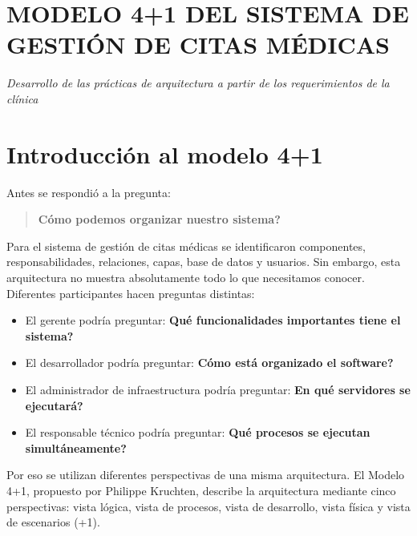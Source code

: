 \begingroup\sffamily\renewcommand{\arraystretch}{1.25}

\newcommand{\bloqueflujo}[1]{\fcolorbox{azuloscuro}{azulclaro}{\parbox{0.48\linewidth}{\centering\textbf{#1}}}}

\newcommand{\flechaflujo}{\textcolor{azuloscuro}{\Large$\downarrow$}}
\section*{MODELO 4+1 DEL SISTEMA DE GESTIÓN DE CITAS MÉDICAS}
\begin{center}
\textit{Desarrollo de las prácticas de arquitectura a partir de los requerimientos de la clínica}
\end{center}

\section{Introducción al modelo 4+1}

Antes se respondió a la pregunta:

\begin{quote}
\textbf{\textquestiondown{}Cómo podemos organizar nuestro sistema?}
\end{quote}

Para el sistema de gestión de citas médicas se identificaron componentes, responsabilidades, relaciones, capas, base de datos y usuarios. Sin embargo, esta arquitectura no muestra absolutamente todo lo que necesitamos conocer. Diferentes participantes hacen preguntas distintas:

\begin{itemize}
    \item El gerente podría preguntar: \textbf{\textquestiondown{}Qué funcionalidades importantes tiene el sistema?}
    \item El desarrollador podría preguntar: \textbf{\textquestiondown{}Cómo está organizado el software?}
    \item El administrador de infraestructura podría preguntar: \textbf{\textquestiondown{}En qué servidores se ejecutará?}
    \item El responsable técnico podría preguntar: \textbf{\textquestiondown{}Qué procesos se ejecutan simultáneamente?}
\end{itemize}

Por eso se utilizan diferentes perspectivas de una misma arquitectura. El Modelo 4+1, propuesto por Philippe Kruchten, describe la arquitectura mediante cinco perspectivas: vista lógica, vista de procesos, vista de desarrollo, vista física y vista de escenarios (+1).

